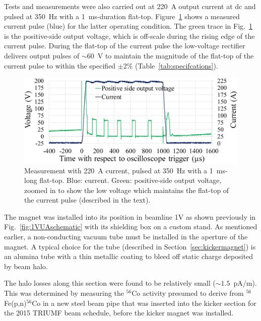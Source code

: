 \documentclass[aps,prab,twocolumn,superscriptaddress]{revtex4-1}
\begin{document}
Tests and measurements were also carried out at 220~A output current at dc and pulsed at 350~Hz with a 1~ms-duration flat-top. Figure~\ref{fig:220A350Hz1ms} shows a measured current pulse (blue) for the latter operating condition. The green trace in Fig.~\ref{fig:220A350Hz1ms} is the positive-side output voltage, which is off-scale during the rising edge of the current pulse. During the flat-top of the current pulse the low-voltage rectifier delivers output pulses of $\sim$60~V to maintain the magnitude of the flat-top of the current pulse to within the specified $\pm$2\% (Table~\ref{tab:specifcations}). 
\begin{figure}%
  \includegraphics[width=\linewidth]{220A-350Hz-T0031-smaller.png}
\caption{Measurement with 220~A current, pulsed at 350~Hz with a 1~ms-long flat-top. Blue: current. Green: positive-side output voltage, zoomed in to show the low voltage which maintains the flat-top of the current pulse (described in the text).}%
\label{fig:220A350Hz1ms}
\end{figure}

The magnet was installed into its position in beamline 1V as shown previously in Fig.~\ref{fig:1VUAschematic} with its shielding box on a custom stand. As mentioned earlier, a non-conducting vacuum tube must be installed in the aperture of the magnet.  A typical choice for the tube (described in Section~\ref{sec:kickermagnet}) is an alumina tube with a thin metallic coating to bleed off static charge deposited by beam halo.

The halo losses along this section were found to be relatively small ($\sim 1.5$~pA/m).  This was determined by measuring the $^{56}$Co activity presumed to derive from $^{56}$Fe(p,n)$^{56}$Co in a new steel beam pipe that was inserted into the kicker section for the 2015 TRIUMF beam schedule, before the kicker magnet was installed.
\end{document}
